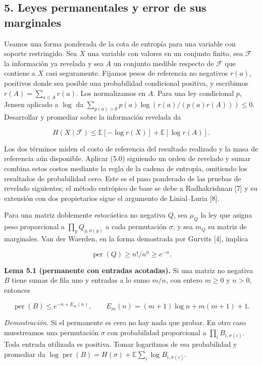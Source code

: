 \documentclass[spanish,11pt,a4paper]{article}
\begin{document}
\subsection{5. Leyes permanentales y error de sus marginales}\label{leyes-permanentales-y-error-de-sus-marginales}

Usamos una forma ponderada de la cota de entropía para una variable con soporte restringido. Sea \(X\) una variable con valores en un conjunto finito, sea \(\mathcal F\) la información ya revelada y sea \(A\) un conjunto medible respecto de \(\mathcal F\) que contiene a \(X\) casi seguramente. Fijamos pesos de referencia no negativos \(r(a)\), positivos donde sea posible una probabilidad condicional positiva, y escribimos \(r(A)=\sum_{a\in A}r(a)\). Los normalizamos en \(A\). Para una ley condicional \(p\), Jensen aplicado a \(\log\) da \(\sum_{p(a)>0}p(a)\log(r(a)/(p(a)r(A)))\le0\). Desarrollar y promediar sobre la información revelada da

\nopagebreak[4]
\[H(X\mid\mathcal F)\le
\mathbb E[-\log r(X)]+\mathbb E[\log r(A)].\tag{5.0}\]

Los dos términos miden el costo de referencia del resultado realizado y la masa de referencia aún disponible. Aplicar (5.0) siguiendo un orden de revelado y sumar combina estos costos mediante la regla de la cadena de entropía, omitiendo los resultados de probabilidad cero. Este es el paso ponderado de las pruebas de revelado siguientes; el método entrópico de base se debe a Radhakrishnan {[}7{]} y su extensión con dos propietarios sigue el argumento de Linial--Luria {[}8{]}.

Para una matriz doblemente estocástica no negativa \(Q\), sea \(\mu_Q\) la ley que asigna peso proporcional a \(\prod_yQ_{y,\sigma(y)}\) a cada permutación \(\sigma\), y sea \(m_Q\) su matriz de marginales. Van der Waerden, en la forma demostrada por Gurvits {[}4{]}, implica

\nopagebreak[4]
\[\operatorname{per}(Q)\ge n!/n^n\ge e^{-n}.\tag{5.1}\]

\textbf{Lema 5.1 (permanente con entradas acotadas).} Si una matriz no negativa \(B\) tiene sumas de fila uno y entradas a lo sumo \(m/n\), con entero \(m\ge0\) y \(n>0\), entonces

\nopagebreak[4]
\[\operatorname{per}(B)\le e^{-n+E_m(n)},\qquad
E_m(n)=(m+1)\log n+m(m+1)+1.\tag{5.2}\]

\emph{Demostración.} Si el permanente es cero no hay nada que probar. En otro caso muestreamos una permutación \(\sigma\) con probabilidad proporcional a \(\prod_iB_{i,\sigma(i)}\). Toda entrada utilizada es positiva. Tomar logaritmos de esa probabilidad y promediar da \(\log\operatorname{per}(B)=H(\sigma)+\mathbb E\sum_i\log B_{i,\sigma(i)}\).
\end{document}
